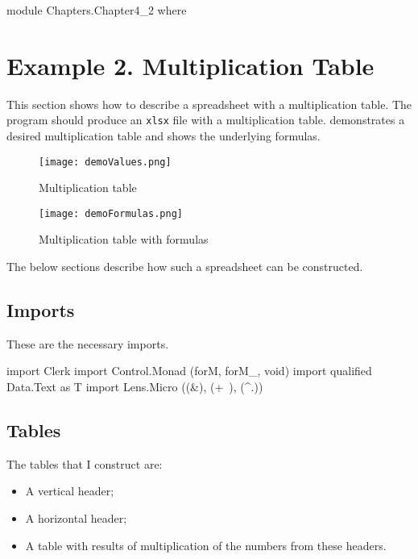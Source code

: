 
module Chapters.Chapter4_2 where


\section{Example 2. Multiplication Table}
\label{sec:ex2}

This section shows how to describe a spreadsheet with a multiplication table. The program should produce an \texttt{xlsx} file with a multiplication table.  demonstrates a desired multiplication table and  shows the underlying formulas.

\begin{figure}[h]
  \centering
  \texttt{[image: demoValues.png]}
  \caption{Multiplication table}
  \label{fig:mult}
\end{figure}

\begin{figure}[h]
  \centering
  \texttt{[image: demoFormulas.png]}
  \caption{Multiplication table with formulas}
  \label{fig:mult_formulas}
\end{figure}

The below sections describe how such a spreadsheet can be constructed.

\subsection{Imports}

These are the necessary imports.

\begin{mycode}
import Clerk
import Control.Monad (forM, forM_, void)
import qualified Data.Text as T
import Lens.Micro ((&), (+~), (^.))
\end{mycode}

\subsection{Tables}

The tables that I construct are:

\begin{itemize}
  \item A vertical header;
  \item A horizontal header;
  \item A table with results of multiplication of the numbers from these headers.
\end{itemize}

